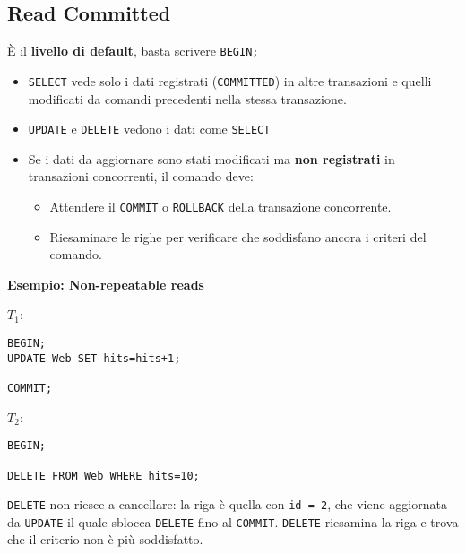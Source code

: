 \documentclass[a4paper, 10pt]{article}
\begin{document}
		\subsection{Read Committed}
			È il \textbf{livello di default}, basta scrivere \lstinline|BEGIN;|
			\begin{itemize}
				\item \lstinline|SELECT| vede solo i dati registrati (\lstinline|COMMITTED|) in altre transazioni e quelli modificati da comandi precedenti nella stessa transazione.
				\item \lstinline|UPDATE| e \lstinline|DELETE| vedono i dati come \lstinline|SELECT|
				\item Se i dati da aggiornare sono stati modificati ma \textbf{non registrati} in transazioni concorrenti, il comando deve:
				\begin{itemize}
					\item Attendere il \lstinline|COMMIT| o \lstinline|ROLLBACK| della transazione concorrente.
					\item Riesaminare le righe per verificare che soddisfano ancora i criteri del comando.
				\end{itemize}
			\end{itemize}
			\textbf{Esempio: Non-repeatable reads}
			\begin{multicols}{2}
				\noindent
				$ T_1 $:
				\begin{lstlisting}
BEGIN;
UPDATE Web SET hits=hits+1;

COMMIT;
				\end{lstlisting}
				\columnbreak
				$ T_2 $:
				\begin{lstlisting}
BEGIN;

DELETE FROM Web WHERE hits=10;

				\end{lstlisting}
			\end{multicols}
			\lstinline|DELETE| non riesce a cancellare: la riga è quella con \lstinline|id = 2|, che viene aggiornata da \lstinline|UPDATE| il quale sblocca \lstinline|DELETE| fino al \lstinline|COMMIT|. \lstinline|DELETE| riesamina la riga e trova che il criterio non è più soddisfatto.
			
\end{document}
